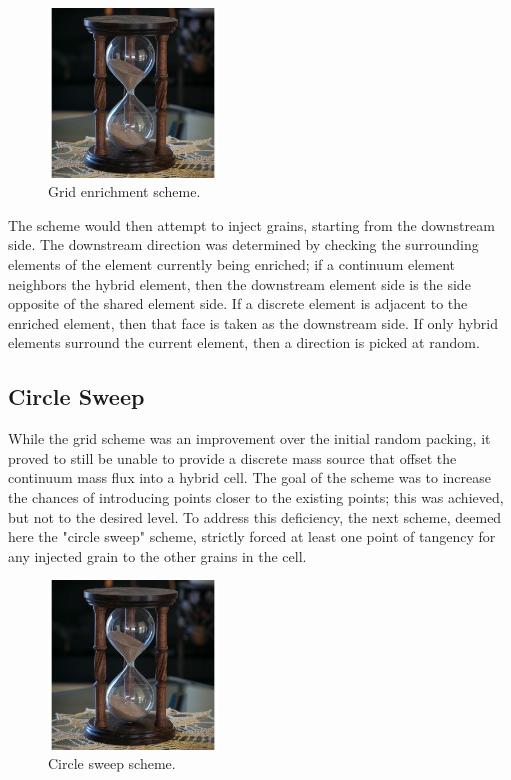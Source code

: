 \begin{figure}[htp] 
    \centering
    \includegraphics[width=0.4\textwidth]{figs/hourglass_whole.jpg}
    \caption{Grid enrichment scheme.}
    \label{grid_enrichment}
\end{figure}

The scheme would then attempt to inject grains, starting from the downstream side. The downstream direction was determined by checking the surrounding elements of the element currently being enriched; if a continuum element neighbors the hybrid element, then the downstream element side is the side opposite of the shared element side. If a discrete element is adjacent to the enriched element, then that face is taken as the downstream side. If only hybrid elements surround the current element, then a direction is picked at random. 

\subsection{Circle Sweep}
\def\seed{\textbf{seed\_queue}}
While the grid scheme was an improvement over the initial random packing, it proved to still be unable to provide a discrete mass source that offset the continuum mass flux into a hybrid cell. The goal of the scheme was to increase the chances of introducing points closer to the existing points; this was achieved, but not to the desired level. To address this deficiency, the next scheme, deemed here the "circle sweep" scheme, strictly forced at least one point of tangency for any injected grain to the other grains in the cell.

\begin{figure}[htp] 
    \centering
    \includegraphics[width=0.4\textwidth]{figs/hourglass_whole.jpg}
    \caption{Circle sweep scheme.}
    \label{circle_sweep_enrichment}
\end{figure}

